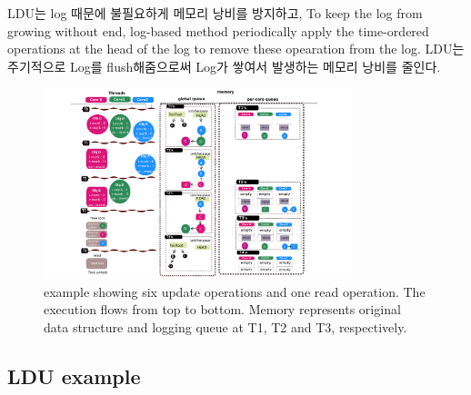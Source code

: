 \fi



\ifkor
LDU는 log 때문에 불필요하게 메모리 낭비를 방지하고, To keep the log from growing without end,
log-based method periodically apply the time-ordered operations at the head of
the log to remove these opearation from the log.
LDU는 주기적으로 Log를 flush해줌으로써 Log가 쌓여서 발생하는 메모리 낭비를 줄인다.
\else





\fi






\begin{figure}[t!]
  \begin{center}
     \includegraphics[width=0.8\textwidth,height=0.4\textheight,keepaspectratio]{fig/basic_gldu}
  \end{center}
  \caption{ example showing six update operations and one read
  operation. The execution flows from top to bottom. Memory represents original
  data structure and logging queue at T1, T2 and T3, respectively.}
  \label{fig:basic}
\end{figure}





\subsection{LDU example}

